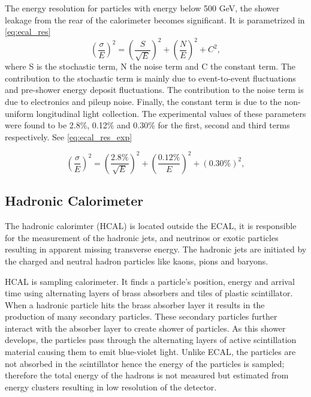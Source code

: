 The energy resolution for particles with energy below 500 GeV, the shower leakage from the rear of the calorimeter becomes significant. It is parametrized in \ref{eq:ecal_res}
\begin{equation}
\left(\frac{\sigma}{E}\right)^{2} = \left(\frac{S}{\sqrt{E}}\right)^{2} + \left(\frac{N}{E}\right)^{2} + C^{2},
  \label{eq:ecal_res}
\end{equation}
where S is the stochastic term, N the noise term and C the constant term. The contribution to the stochastic term is mainly due to event-to-event fluctuations and pre-shower energy deposit fluctuations. The contribution to the noise term is due to electronics and pileup noise. Finally, the constant term is due to the non-uniform longitudinal light collection. The experimental values of these parameters were found to be 2.8\%, 0.12\% and 0.30\% for the first, second and third terms respectively. See \ref{eq:ecal_res_exp}

\begin{equation}
\left(\frac{\sigma}{E}\right)^{2} = \left(\frac{2.8\%}{\sqrt{E}}\right)^{2} + \left(\frac{0.12\%}{E}\right)^{2} + \left(0.30\%\right)^{2},
  \label{eq:ecal_res_exp}
\end{equation}
\subsection{Hadronic Calorimeter}
The hadronic calorimter (HCAL) \cite{Freeman:hcal} is located outside the ECAL, it is responsible for the measurement of the hadronic jets, and neutrinos or exotic particles resulting in apparent missing transverse energy. The hadronic jets are initiated by the charged and neutral hadron particles like kaons, pions and baryons.

HCAL is sampling calorimeter. It finds a particle’s position, energy and arrival time using alternating layers of brass absorbers and tiles of plastic scintillator. When a hadronic particle hits the brass absorber layer it results in the production of many secondary particles. These secondary particles further interact with the absorber layer to create shower of particles. As this shower develops, the particles pass through the alternating layers of active scintillation material causing them to emit blue-violet light. Unlike ECAL, the particles are not absorbed in the scintillator hence the energy of the particles is sampled; therefore the total energy of the hadrons is not measured but estimated from energy clusters resulting in low resolution of the detector. 

